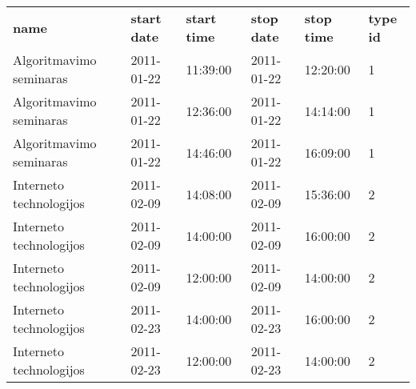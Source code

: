 \begin{tabularx}{\textwidth}{p{6em} X X X X X}
  { \bf name }              & { \bf start date} & { \bf start time} & { \bf stop date} 
  &  { \bf stop time} & { \bf type id}\\
  Algoritmavimo seminaras   & 2011-01-22  & 11:39:00   & 2011-01-22 &  12:20:00   & 1\\
  Algoritmavimo seminaras   & 2011-01-22  & 12:36:00   & 2011-01-22 &  14:14:00   & 1\\
  Algoritmavimo seminaras   & 2011-01-22  & 14:46:00   & 2011-01-22 &  16:09:00   & 1\\
 Interneto technologijos   & 2011-02-09  & 14:08:00   & 2011-02-09 &  15:36:00   & 2\\
 Interneto technologijos   & 2011-02-09  & 14:00:00   & 2011-02-09 &  16:00:00   & 2\\
 Interneto technologijos   & 2011-02-09  & 12:00:00   & 2011-02-09 &  14:00:00   & 2\\
 Interneto technologijos   & 2011-02-23  & 14:00:00   & 2011-02-23 &  16:00:00   & 2\\
 Interneto technologijos   & 2011-02-23  & 12:00:00   & 2011-02-23 &  14:00:00   & 2\\

\end{tabularx}
